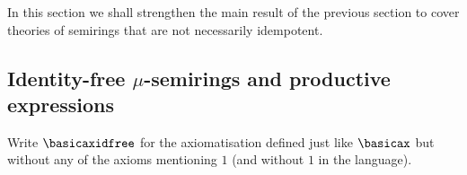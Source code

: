 In this section we shall strengthen the main result of the previous section to cover theories of semirings that are not necessarily idempotent.




    



\subsection{Identity-free $\mu$-semirings and productive expressions}

Write $\basicaxidfree$ for the axiomatisation defined just like $\basicax$ but without any of the axioms mentioning $1$ (and without $1$ in the language).

